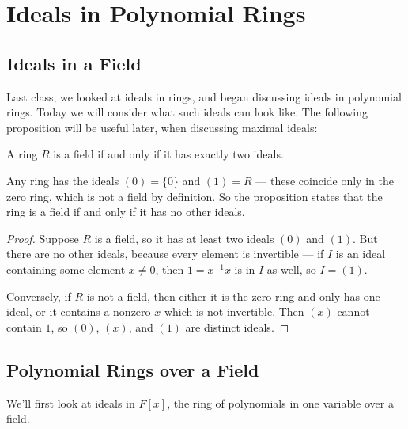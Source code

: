 

\section{Ideals in Polynomial Rings}

\subsection{Ideals in a Field}

Last class, we looked at ideals in rings, and began discussing ideals in polynomial rings. Today we will consider what such ideals can look like. The following proposition will be useful later, when discussing maximal ideals:

\begin{proposition} \label{field iff two ideals}
    A ring $R$ is a field if and only if it has exactly two ideals. 
\end{proposition}

Any ring has the ideals $(0) = \{0\}$ and $(1) = R$ --- these coincide only in the zero ring, which is not a field by definition. So the proposition states that the ring is a field if and only if it has no other ideals. 

\begin{proof}
    Suppose $R$ is a field, so it has at least two ideals $(0)$ and $(1)$. But there are no other ideals, because every element is invertible --- if $I$ is an ideal containing some element $x \neq 0$, then $1 = x^{-1}x$ is in $I$ as well, so $I = (1)$. 

    Conversely, if $R$ is not a field, then either it is the zero ring and only has one ideal, or it contains a nonzero $x$ which is not invertible. Then $(x)$ cannot contain $1$, so $(0)$, $(x)$, and $(1)$ are distinct ideals. 
\end{proof}

\subsection{Polynomial Rings over a Field}

We'll first look at ideals in $F[x]$, the ring of polynomials in one variable over a field. 

